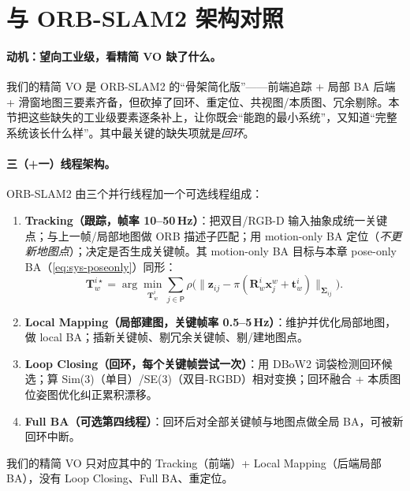 \section{与 ORB-SLAM2 架构对照}
\label{sec:sys-orbslam}
\label{sec:sys-loop}

\paragraph{动机：望向工业级，看精简 VO 缺了什么。}
我们的精简 VO 是 ORB-SLAM2 的“骨架简化版”——前端追踪 + 局部 BA 后端 + 滑窗地图三要素齐备，但砍掉了回环、重定位、共视图/本质图、冗余剔除。本节把这些缺失的工业级要素逐条补上，让你既会“能跑的最小系统”，又知道“完整系统该长什么样”。其中最关键的缺失项就是\emph{回环}。

\paragraph{三（+一）线程架构。}
ORB-SLAM2\cite{murartal2017orbslam2} 由三个并行线程加一个可选线程组成：
\begin{enumerate}
  \item \textbf{Tracking（跟踪，帧率 10--50\,Hz）}：把双目/RGB-D 输入抽象成统一关键点；与上一帧/局部地图做 ORB 描述子匹配；用 motion-only BA 定位（\emph{不更新地图点}）；决定是否生成关键帧。其 motion-only BA 目标与本章 pose-only BA（\cref{eq:sys-poseonly}）同形：
  \begin{equation}
  \mathbf{T}_w^{i\star}=\arg\min_{\mathbf{T}_w^i}\sum_{j\in\mathsf{P}}\rho\Big(\big\|\mathbf{z}_{ij}-\pi(\mathbf{R}_w^i\mathbf{x}_j^w+\mathbf{t}_w^i)\big\|_{\boldsymbol\Sigma_{ij}}\Big).
  \label{eq:sys-orb-motiononly}
  \end{equation}
  \item \textbf{Local Mapping（局部建图，关键帧率 0.5--5\,Hz）}：维护并优化局部地图，做 local BA；插新关键帧、剔冗余关键帧、剔/建地图点。
  \item \textbf{Loop Closing（回环，每个关键帧尝试一次）}：用 DBoW2 词袋检测回环候选；算 Sim(3)（单目）/SE(3)（双目-RGBD）相对变换；回环融合 + 本质图位姿图优化纠正累积漂移。
  \item \textbf{Full BA（可选第四线程）}：回环后对全部关键帧与地图点做全局 BA，可被新回环中断。
\end{enumerate}
我们的精简 VO 只对应其中的 Tracking（前端）+ Local Mapping（后端局部 BA），没有 Loop Closing、Full BA、重定位。

